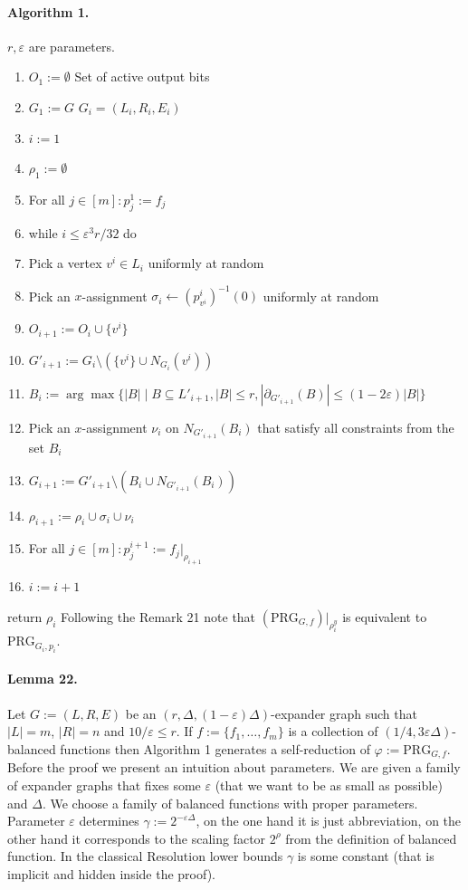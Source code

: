 \documentclass[10pt,a4paper]{article}
\begin{document}
\paragraph{Algorithm 1.} $r,\varepsilon$ are parameters.
\begin{enumerate}
\item $O_1:=\emptyset$ \hfill Set of active output bits
\item $G_1:=G$ \hfill $G_i=(L_i,R_i,E_i)$
\item $i:=1$
\item $\rho_1:=\emptyset$
\item For all $j\in[m]:p_j^1:=f_j$
\item while $i\leq\varepsilon^3r/32$ do
\item \quad Pick a vertex $v^i\in L_i$ uniformly at random
\item \quad Pick an $x$-assignment $\sigma_i\leftarrow(p_{v^i}^i)^{-1}(0)$ uniformly at random
\item \quad $O_{i+1}:=O_i\cup\{v^i\}$
\item \quad $G'_{i+1}:=G_i\setminus(\{v^i\}\cup N_{G_i}(v^i))$
\item \quad $B_i:=\arg\max\{|B|\mid B\subseteq L'_{i+1},|B|\leq r,|\partial_{G'_{i+1}}(B)|\leq(1-2\varepsilon)|B|\}$
\item \quad Pick an $x$-assignment $\nu_i$ on $N_{G'_{i+1}}(B_i)$ that satisfy all constraints from the set $B_i$
\item \quad $G_{i+1}:=G'_{i+1}\setminus(B_i\cup N_{G'_{i+1}}(B_i))$
\item \quad $\rho_{i+1}:=\rho_i\cup\sigma_i\cup\nu_i$
\item \quad For all $j\in[m]:p_j^{i+1}:=f_j|_{\rho_{i+1}}$
\item \quad $i:=i+1$
\end{enumerate}
return $\rho_i$
Following the Remark 21 note that $(\mathrm{PRG}_{G,f})|_{\rho_i^y}$ is equivalent to $\mathrm{PRG}_{G_i,p_i}$.
\paragraph{Lemma 22.} Let $G:=(L,R,E)$ be an $(r,\Delta,(1-\varepsilon)\Delta)$-expander graph such that $|L|=m$, $|R|=n$ and $10/\varepsilon\leq r$. If $f:=\{f_1,\ldots,f_m\}$ is a collection of $(1/4,3\varepsilon\Delta)$-balanced functions then Algorithm 1 generates a self-reduction of $\varphi:=\mathrm{PRG}_{G,f}$.
Before the proof we present an intuition about parameters. We are given a family of expander graphs that fixes some $\varepsilon$ (that we want to be as small as possible) and $\Delta$. We choose a family of balanced functions with proper parameters. Parameter $\varepsilon$ determines $\gamma:=2^{-\varepsilon\Delta}$, on the one hand it is just abbreviation, on the other hand it corresponds to the scaling factor $2^\rho$ from the definition of balanced function. In the classical Resolution lower bounds $\gamma$ is some constant (that is implicit and hidden inside the proof).
\end{document}
